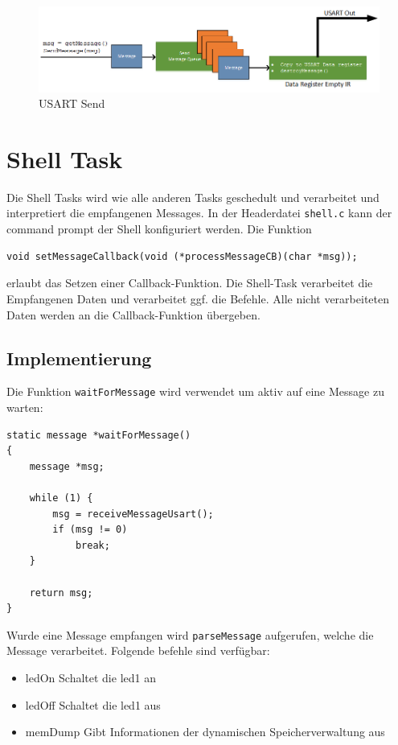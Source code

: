 \documentclass[fontsize=12pt, toc=bibliography, notitlepage]{scrreprt}
\begin{document}
\begin{figure}[H]
	\centering
	\includegraphics[width=450px]{images/UsartOut.png}
	\caption{USART Send}
	\label{fig:usart_send}
\end{figure}

\section{Shell Task}
\label{subsec:shell-task}
Die Shell Tasks wird wie alle anderen Tasks geschedult und verarbeitet und interpretiert die empfangenen Messages. In der Headerdatei \lstinline{shell.c} kann der command prompt der Shell konfiguriert werden. Die Funktion\\

\begin{lstlisting}
void setMessageCallback(void (*processMessageCB)(char *msg));
\end{lstlisting}

erlaubt das Setzen einer Callback-Funktion. Die Shell-Task verarbeitet die Empfangenen Daten und verarbeitet ggf. die Befehle. Alle nicht verarbeiteten Daten werden an die Callback-Funktion übergeben.

\subsection{Implementierung}
Die Funktion \lstinline{waitForMessage} wird verwendet um aktiv auf eine Message zu warten:

\begin{lstlisting}
static message *waitForMessage()
{
    message *msg;

    while (1) {
        msg = receiveMessageUsart();
        if (msg != 0)
            break;
    }

    return msg;
}
\end{lstlisting}

Wurde eine Message empfangen wird \lstinline{parseMessage} aufgerufen, welche die Message verarbeitet. Folgende befehle sind verfügbar:

\begin{itemize}
	\item ledOn Schaltet die led1 an
	\item ledOff Schaltet die led1 aus
	\item memDump Gibt Informationen der dynamischen Speicherverwaltung aus
\end{itemize}
\end{document}
